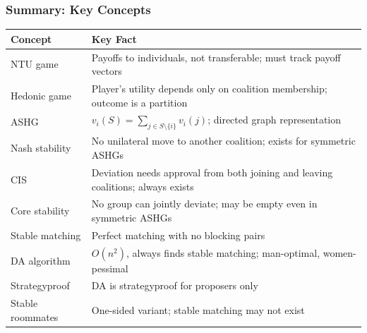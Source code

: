 \bigseparator

\subsubsection{Summary: Key Concepts}

\begin{center}
\renewcommand{\arraystretch}{1.4}
\begin{tabular}{@{} l p{9.5cm} @{}}
\toprule
\textbf{Concept} & \textbf{Key Fact} \\
\midrule
NTU game & Payoffs to individuals, not transferable; must track payoff vectors \\
Hedonic game & Player's utility depends only on coalition membership; outcome is a partition \\
ASHG & $v_i(S) = \sum_{j \in S \setminus \{i\}} v_i(j)$; directed graph representation \\
Nash stability & No unilateral move to another coalition; exists for symmetric ASHGs \\
CIS & Deviation needs approval from both joining and leaving coalitions; always exists \\
Core stability & No group can jointly deviate; may be empty even in symmetric ASHGs \\
Stable matching & Perfect matching with no blocking pairs \\
DA algorithm & $O(n^2)$, always finds stable matching; man-optimal, women-pessimal \\
Strategyproof & DA is strategyproof for proposers only \\
Stable roommates & One-sided variant; stable matching may not exist \\
\bottomrule
\end{tabular}
\end{center}
